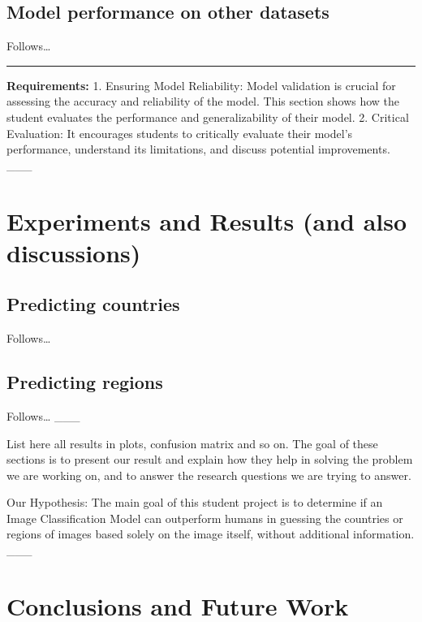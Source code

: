 \documentclass{article}
\begin{document}
\subsection{Model performance on other
datasets}\label{model-performance-on-other-datasets}

Follows\ldots{}

\begin{center}\rule{0.5\linewidth}{0.5pt}\end{center}

\textbf{Requirements:} 1. Ensuring Model Reliability: Model validation
is crucial for assessing the accuracy and reliability of the model. This
section shows how the student evaluates the performance and
generalizability of their model. 2. Critical Evaluation: It encourages
students to critically evaluate their model's performance, understand
its limitations, and discuss potential improvements. \_\_\_

\section{Experiments and Results (and also
discussions)}\label{experiments-and-results-and-also-discussions}

\subsection{Predicting countries}\label{predicting-countries}

Follows\ldots{}

\subsection{Predicting regions}\label{predicting-regions}

Follows\ldots{} \_\_\_

List here all results in plots, confusion matrix and so on. The goal of
these sections is to present our result and explain how they help in
solving the problem we are working on, and to answer the research
questions we are trying to answer.

Our Hypothesis: The main goal of this student project is to determine if
an Image Classification Model can outperform humans in guessing the
countries or regions of images based solely on the image itself, without
additional information. \_\_\_

\section{Conclusions and Future Work}\label{conclusions-and-future-work}
\end{document}
